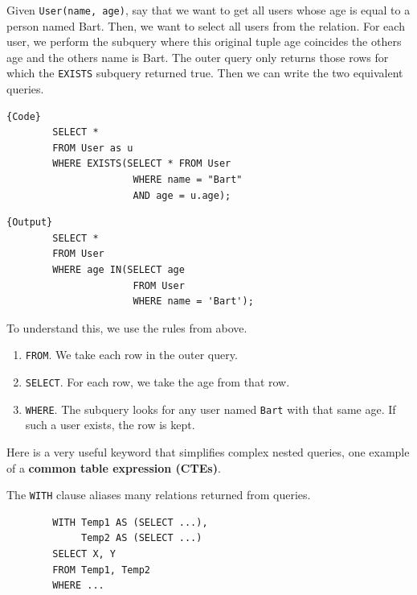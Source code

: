     \begin{example}[Age]
      \label{ex:age}
      Given \texttt{User(name, age)}, say that we want to get all users whose age is equal to a person named Bart. Then, we want to select all users from the relation. For each user, we perform the subquery where this original tuple age coincides the others age and the others name is Bart. The outer query only returns those rows for which the \texttt{EXISTS} subquery returned true. Then we can write the two equivalent queries. 

      \noindent\begin{minipage}{.5\textwidth}
      \begin{lstlisting}[]{Code}
        SELECT * 
        FROM User as u
        WHERE EXISTS(SELECT * FROM User
                      WHERE name = "Bart" 
                      AND age = u.age); 
      \end{lstlisting}
      \end{minipage}
      \hfill
      \begin{minipage}{.49\textwidth}
      \begin{lstlisting}[]{Output}
        SELECT * 
        FROM User 
        WHERE age IN(SELECT age 
                      FROM User 
                      WHERE name = 'Bart'); 
      \end{lstlisting}
      \end{minipage}

      To understand this, we use the rules from above. 
      \begin{enumerate}
        \item \texttt{FROM}. We take each row in the outer query. 
        \item \texttt{SELECT}. For each row, we take the age from that row.  
        \item \texttt{WHERE}. The subquery looks for any user named \texttt{Bart} with that same age. If such a user exists, the row is kept. 
      \end{enumerate}
    \end{example}

    Here is a very useful keyword that simplifies complex nested queries, one example of a \textbf{common table expression (CTEs)}. 
    
    \begin{definition}
      \label{def:with}
      The \texttt{WITH} clause aliases many relations returned from queries. 
      \begin{lstlisting}
        WITH Temp1 AS (SELECT ...), 
             Temp2 AS (SELECT ...) 
        SELECT X, Y 
        FROM Temp1, Temp2 
        WHERE ...
      \end{lstlisting}
    \end{definition}

